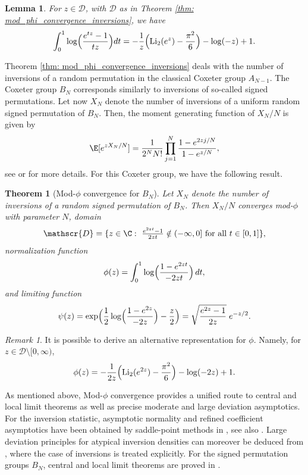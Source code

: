 \documentclass[11pt,a4paper]{scrartcl}
\numberwithin{equation}{section}
\theoremstyle{plain}
\newtheorem{theorem}{Theorem}[section]
\newtheorem{lemma}{Lemma}[section]
\theoremstyle{definition}
\theoremstyle{remark}
\newtheorem{remark}{Remark}[section]
\begin{document}
\begin{lemma}\label{lem: integral identity}
For $z \in \mathscr{D}$, with $\mathscr{D}$ as in Theorem \ref{thm: mod_phi_convergence_inversions}, we have 
\begin{align*}
	\int_0^1 \log\Bigl(\frac{e^{tz}-1}{{tz}}\Bigr)dt = -\frac{1}{z}\Bigl(\operatorname{Li}_2(e^z)-\frac{\pi^2}{6}\Bigr)-\log(-z)+1.
\end{align*}
\end{lemma}

Theorem \ref{thm: mod_phi_convergence_inversions} deals with the number of inversions of a random permutation in the classical Coxeter group $A_{N-1}$. The Coxeter group $B_N$ corresponds similarly to inversions of so-called signed permutations. Let now $X_N$ denote the number of inversions of a uniform random signed permutation of $B_N$. Then, the moment generating function of $X_N/N$ is given by
\[
\E[e^{zX_N/N}] = \frac{1}{ 2^NN!} \prod_{j=1}^N \frac{1-e^{2zj/N}}{1-e^{z/N}},
\]
see \cite[Chapter 7]{bjorner2005combinatorics} or \cite[Chapter 2]{lehrer2009unitary} for more details. For this Coxeter group, we have the following result.

\begin{theorem}[Mod-\(\phi\) convergence for \(B_N\)]\label{thm:modphi-colored}
Let $X_N$ denote the number of inversions of a random signed permutation of $B_N$. Then \(X_N/N\) converges mod-\(\phi\) with parameter \(N\), domain
\[
	\mathscr{D}=\{z\in\C:\ \tfrac{e^{2zt}-1}{2zt}\notin(-\infty,0] \text{ for all } t\in[0,1]\},
\]
normalization function
\[
\phi(z)=\int_0^1 \log\Bigl(\frac{1-e^{2zt}}{-2zt}\Bigr)\,dt,
\]
and limiting function
\[
\psi(z)=\exp\Bigl(\frac12\log\Bigl(\frac{1-e^{2z}}{-2z}\Bigr)-\frac{z}{2}\Bigr)
=\sqrt{\frac{e^{2 z}-1}{2 z}}\;e^{-z/2}.
\]
\end{theorem}

\begin{remark}
It is possible to derive an alternative representation for $\phi$. Namely, for $z\in\mathscr{D}\setminus[0, \infty)$,
$$
\phi(z)
= -\frac{1}{2z}\Bigl(\operatorname{Li}_2(e^{2z})-\frac{\pi^2}{6}\Bigr)
- \log(-2z) + 1.
$$
\end{remark}

As mentioned above, Mod-$\phi$ convergence provides a unified route to central and local limit theorems as well as precise moderate and large deviation asymptotics. For the inversion statistic, asymptotic normality and refined coefficient asymptotics have been obtained by saddle-point methods in \cite{Bender1973CLLT,LouchardProdinger2003Inversions}, see also \cite{Margolius2001PermutationsInversions}. Large deviation principles for atypical inversion densities can moreover be deduced from \cite{BorgaDasMukherjeeWinkler2024LDP}, where the case of inversions is treated explicitly. For the signed permutation groups $B_N$, central and local limit theorems are proved in \cite{KahleStump2020CoxeterInversions}. 
\end{document}
